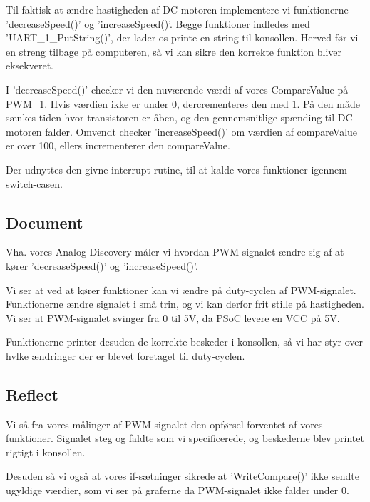 \documentclass[../main.tex]{subfiles}
\begin{document}
Til faktisk at ændre hastigheden af DC-motoren implementere vi funktionerne ’decreaseSpeed()’ og ’increaseSpeed()’. Begge funktioner indledes med ’UART\_1\_PutString()’, der lader os printe en string til konsollen. Herved før vi en streng tilbage på computeren, så vi kan sikre den korrekte funktion bliver eksekveret.


I ’decreaseSpeed()’ checker vi den nuværende værdi af vores CompareValue på PWM\_1. Hvis værdien ikke er under 0, dercrementeres den med 1. På den måde sænkes tiden hvor transistoren er åben, og den gennemsnitlige spænding til DC-motoren falder. Omvendt checker 'increaseSpeed()' om værdien af compareValue er over 100, ellers incrementerer den compareValue.

Der udnyttes den givne interrupt rutine, til at kalde vores funktioner igennem switch-casen.

\subsection{Document}
Vha. vores Analog Discovery måler vi hvordan PWM signalet ændre sig af at kører ’decreaseSpeed()’ og ’increaseSpeed()’.


Vi ser at ved at kører funktioner kan vi ændre på duty-cyclen af PWM-signalet. Funktionerne ændre signalet i små trin, og vi kan derfor frit stille på hastigheden. Vi ser at PWM-signalet svinger fra 0 til 5V, da PSoC levere en VCC på 5V.

Funktionerne printer desuden de korrekte beskeder i konsollen, så vi har styr over hvlke ændringer der er blevet foretaget til duty-cyclen.

\subsection{Reflect}    
Vi så fra vores målinger af PWM-signalet den opførsel forventet af vores funktioner. Signalet steg og faldte som vi specificerede, og beskederne blev printet rigtigt i konsollen.

Desuden så vi også at vores if-sætninger sikrede at ’WriteCompare()’ ikke sendte ugyldige værdier, som vi ser på graferne da PWM-signalet ikke falder under 0.
\end{document}
